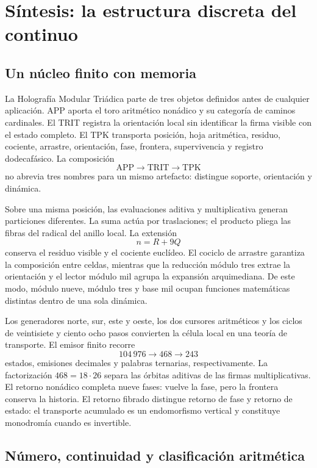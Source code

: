 \chapter{Síntesis: la estructura discreta del continuo}
\label{chap:sintesis-hmt}

\section{Un núcleo finito con memoria}

La Holografía Modular Triádica parte de tres objetos definidos antes de
cualquier aplicación. APP aporta el toro aritmético nonádico y su categoría
de caminos cardinales. El TRIT registra la orientación local sin identificar
la firma visible con el estado completo. El TPK transporta posición, hoja
aritmética, residuo, cociente, arrastre, orientación, fase, frontera,
supervivencia y registro dodecafásico. La composición
\[
\mathrm{APP}\longrightarrow\mathrm{TRIT}
\longrightarrow\mathrm{TPK}
\]
no abrevia tres nombres para un mismo artefacto: distingue soporte,
orientación y dinámica.

Sobre una misma posición, las evaluaciones aditiva y multiplicativa generan
particiones diferentes. La suma actúa por traslaciones; el producto pliega
las fibras del radical del anillo local. La extensión
\[
n=R+9Q
\]
conserva el residuo visible y el cociente euclídeo. El cociclo de arrastre
garantiza la composición entre celdas, mientras que la reducción módulo tres
extrae la orientación y el lector módulo mil agrupa la expansión
arquimediana. De este modo, módulo nueve, módulo tres y base mil ocupan
funciones matemáticas distintas dentro de una sola dinámica.

Los generadores norte, sur, este y oeste, los dos cursores aritméticos y los
ciclos de veintisiete y ciento ocho pasos convierten la célula local en una
teoría de transporte. El emisor finito recorre
\[
104\,976\longrightarrow468\longrightarrow243
\]
estados, emisiones decimales y palabras ternarias, respectivamente. La
factorización \(468=18\cdot26\) separa las órbitas aditivas de las firmas
multiplicativas. El retorno nonádico completa nueve fases: vuelve la fase,
pero la frontera conserva la historia. El retorno fibrado distingue retorno
de fase y retorno de estado: el transporte acumulado es un endomorfismo
vertical y constituye monodromía cuando es invertible.

\section{Número, continuidad y clasificación aritmética}

